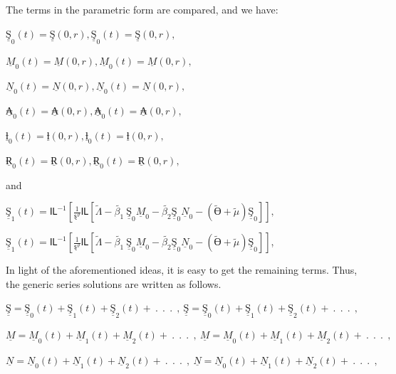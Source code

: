 The terms in the parametric form are compared, and we have:

\({\underline{Ş}}_{0}(t) = \underline{Ş}(0,r),{\underline{Ş}}_{0}(t) = \underline{Ş}(0,r),\)

\({\underline{M}}_{0}(t) = \underline{M}(0,r),{\underline{M}}_{0}(t) = \underline{M}(0,r),\)

\({\underline{N}}_{0}(t) = \underline{N}(0,r),{\underline{N}}_{0}(t) = \underline{N}(0,r),\)

\({\underline{₳}}_{0}(t) = \underline{₳}(0,r),{\underline{₳}}_{0}(t) = \underline{₳}(0,r),\)

\({\underline{ƚ}}_{0}(t) = \underline{ƚ}(0,r),{\underline{ƚ}}_{0}(t) = \underline{ƚ}(0,r),\)

\({\underline{Ɍ}}_{0}(t) = \underline{Ɍ}(0,r),{\underline{Ɍ}}_{0}(t) = \underline{Ɍ}(0,r),\)

and

\({\underline{Ş}}_{1}(t) = Ỻ^{- 1}\left\lbrack \frac{1}{ȿ^{\vartheta}}Ỻ\left\lbrack \widetilde{\Lambda} - \widetilde{\beta_{1}}\ {\underline{Ş}}_{0}{\underline{M}}_{0} - \widetilde{\beta_{2}}{\underline{Ş}}_{0}{\underline{N}}_{0} - \left( \widetilde{Ө} + \widetilde{\mu} \right){\underline{Ş}}_{0} \right\rbrack \right\rbrack,\)

\({\underline{Ş}}_{1}(t) = Ỻ^{- 1}\left\lbrack \frac{1}{ȿ^{\vartheta}}Ỻ\left\lbrack \widetilde{\Lambda} - \widetilde{\beta_{1}}\ {\underline{Ş}}_{0}{\underline{M}}_{0} - \widetilde{\beta_{2}}{\underline{Ş}}_{0}{\underline{N}}_{0} - \left( \widetilde{Ө} + \widetilde{\mu} \right){\underline{Ş}}_{0} \right\rbrack \right\rbrack\),

In light of the aforementioned ideas, it is easy to get the remaining terms. Thus, the generic series solutions are written as follows.

\(\underline{Ş} = {\underline{Ş}}_{0}(t) + {\underline{Ş}}_{1}(t) + {\underline{Ş}}_{2}(t) + \ .\ \ .\ \ .\ \ ,\ \underline{Ş} = {\underline{Ş}}_{0}(t) + {\underline{Ş}}_{1}(t) + {\underline{Ş}}_{2}(t) + \ .\ \ .\ \ .\ \ ,\)

\(\underline{M} = {\underline{M}}_{0}(t) + {\underline{M}}_{1}(t) + {\underline{M}}_{2}(t) + \ .\ \ .\ \ .\ \ ,\ \underline{M} = {\underline{M}}_{0}(t) + {\underline{M}}_{1}(t) + {\underline{M}}_{2}(t) + \ .\ \ .\ \ .\ \ ,\)

\(\underline{N} = {\underline{N}}_{0}(t) + {\underline{N}}_{1}(t) + {\underline{N}}_{2}(t) + \ .\ \ .\ \ .\ \ ,\ \underline{N} = {\underline{N}}_{0}(t) + {\underline{N}}_{1}(t) + {\underline{N}}_{2}(t) + \ .\ \ .\ \ .\ \ ,\)

